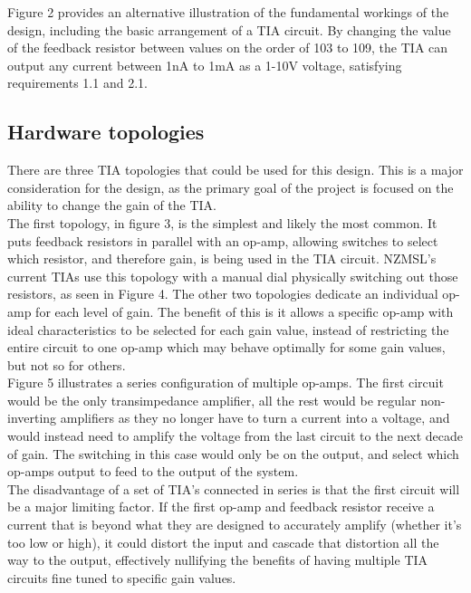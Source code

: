 \documentclass[conference]{IEEEtran}
\begin{document}
Figure 2 provides an alternative illustration of the fundamental workings of the design, including the basic arrangement of a TIA circuit. By changing the value of the feedback resistor between values on the order of 103 to 109, the TIA can output any current between 1nA to 1mA as a 1-10V voltage, satisfying requirements 1.1 and 2.1.

\subsection{Hardware topologies}

There are three TIA topologies that could be used for this design. This is a major consideration for the design, as the primary goal of the project is focused on the ability to change the gain of the TIA. \\

The first topology, in figure 3, is the simplest and likely the most common. It puts feedback resistors in parallel with an op-amp, allowing switches to select which resistor, and therefore gain, is being used in the TIA circuit. NZMSL’s current TIAs use this topology with a manual dial physically switching out those resistors, as seen in Figure 4.
The other two topologies dedicate an individual op-amp for each level of gain. The benefit of this is it allows a specific op-amp with ideal characteristics to be selected for each gain value, instead of restricting the entire circuit to one op-amp which may behave optimally for some gain values, but not so for others. \\

Figure 5 illustrates a series configuration of multiple op-amps. The first circuit would be the only transimpedance amplifier, all the rest would be regular non-inverting amplifiers as they no longer have to turn a current into a voltage, and would instead need to amplify the voltage from the last circuit to the next decade of gain. The switching in this case would only be on the output, and select which op-amps output to feed to the output of the system.  \\

The disadvantage of a set of TIA’s connected in series is that the first circuit will be a major limiting factor. If the first op-amp and feedback resistor receive a current that is beyond what they are designed to accurately amplify (whether it’s too low or high), it could distort the input and cascade that distortion all the way to the output, effectively nullifying the benefits of having multiple TIA circuits fine tuned to specific gain values. \\
\end{document}
